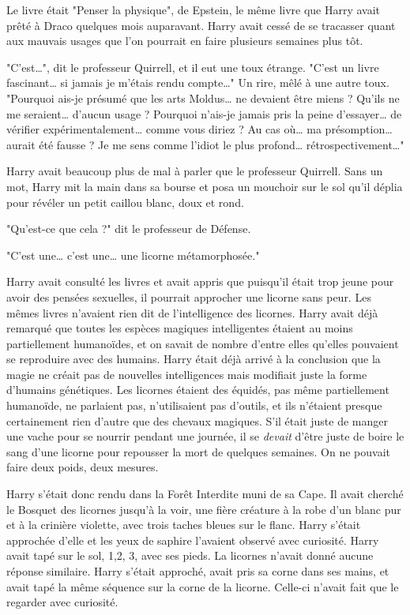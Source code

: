 Le livre était "Penser la physique", de Epstein, le même livre que Harry avait prêté à Draco quelques mois auparavant. Harry avait cessé de se tracasser quant aux mauvais usages que l'on pourrait en faire plusieurs semaines plus tôt.

"C'est…", dit le professeur Quirrell, et il eut une toux étrange. "C'est un livre fascinant… si jamais je m'étais rendu compte…" Un rire, mêlé à une autre toux. "Pourquoi ais-je présumé que les arts Moldus… ne devaient être miens ? Qu'ils ne me seraient… d'aucun usage ? Pourquoi n'ais-je jamais pris la peine d'essayer… de vérifier expérimentalement… comme vous diriez ? Au cas où… ma présomption… aurait été fausse ? Je me sens comme l'idiot le plus profond… rétrospectivement…"

Harry avait beaucoup plus de mal à parler que le professeur Quirrell. Sans un mot, Harry mit la main dans sa bourse et posa un mouchoir sur le sol qu'il déplia pour révéler un petit caillou blanc, doux et rond.

"Qu'est-ce que cela ?" dit le professeur de Défense.

"C'est une… c'est une… une licorne métamorphosée."

Harry avait consulté les livres et avait appris que puisqu'il était trop jeune pour avoir des pensées sexuelles, il pourrait approcher une licorne sans peur. Les mêmes livres n'avaient rien dit de l'intelligence des licornes. Harry avait déjà remarqué que toutes les espèces magiques intelligentes étaient au moins partiellement humanoïdes, et on savait de nombre d'entre elles qu'elles pouvaient se reproduire avec des humains. Harry était déjà arrivé à la conclusion que la magie ne créait pas de nouvelles intelligences mais modifiait juste la forme d'humains génétiques. Les licornes étaient des équidés, pas même partiellement humanoïde, ne parlaient pas, n'utilisaient pas d'outils, et ils n'étaient presque certainement rien d'autre que des chevaux magiques. S'il était juste de manger une vache pour se nourrir pendant une journée, il se \emph{devait}  d'être juste de boire le sang d'une licorne pour repousser la mort de quelques semaines. On ne pouvait faire deux poids, deux mesures.

Harry s'était donc rendu dans la Forêt Interdite muni de sa Cape. Il avait cherché le Bosquet des licornes jusqu'à la voir, une fière créature à la robe d'un blanc pur et à la crinière violette, avec trois taches bleues sur le flanc. Harry s'était approchée d'elle et les yeux de saphire l'avaient observé avec curiosité. Harry avait tapé sur le sol, 1,2, 3, avec ses pieds. La licornes n'avait donné aucune réponse similaire. Harry s'était approché, avait pris sa corne dans ses mains, et avait tapé la même séquence sur la corne de la licorne. Celle-ci n'avait fait que le regarder avec curiosité.

